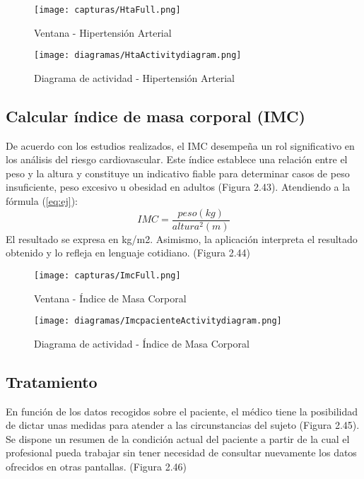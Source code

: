 \documentclass[11pt,spanish,
		listoftables,listoffigures]
		{tfgplantilla}
\begin{document}
\begin{figure}[H]
\centering
\texttt{[image: capturas/HtaFull.png]}
\caption{Ventana - Hipertensión Arterial}
\end{figure}

\newpage
\begin{figure}[H]
\centering
\texttt{[image: diagramas/HtaActivitydiagram.png]}
\caption{Diagrama de actividad - Hipertensión Arterial}
\end{figure}

\newpage
\subsection {Calcular índice de masa corporal (IMC)}

De acuerdo con los estudios realizados, el IMC desempeña un rol significativo en los análisis del riesgo cardiovascular. Este índice establece una relación entre el peso y la altura y constituye un indicativo fiable para determinar casos de peso insuficiente, peso excesivo u obesidad en adultos (Figura 2.43). 
Atendiendo a la fórmula (\ref{eq:ej}):
\begin{equation}\label{eq:ej}
IMC = \frac{peso (kg)}{altura^2 (m)}
\end{equation}
El resultado se expresa en kg/m2. Asimismo, la aplicación interpreta el resultado obtenido y lo refleja en lenguaje cotidiano. (Figura 2.44)

\begin{figure}[H]
\centering
\texttt{[image: capturas/ImcFull.png]}
\caption{Ventana - Índice de Masa Corporal}
\end{figure}

\newpage
\begin{figure}[H]
\centering
\texttt{[image: diagramas/ImcpacienteActivitydiagram.png]}
\caption{Diagrama de actividad - Índice de Masa Corporal}
\end{figure}

\newpage
\subsection {Tratamiento}

En función de los datos recogidos sobre el paciente, el médico tiene la posibilidad de dictar unas medidas para atender a las circunstancias del sujeto (Figura 2.45). Se dispone un resumen de la condición actual del paciente a partir de la cual el profesional pueda trabajar sin tener necesidad de consultar nuevamente los datos ofrecidos en otras pantallas. (Figura 2.46)
\end{document}
